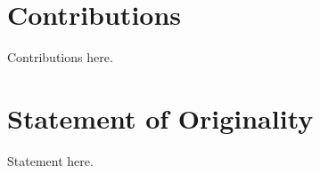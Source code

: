 \subsection{}

\section{Contributions}

Contributions here.


\section{Statement of Originality}

Statement here.